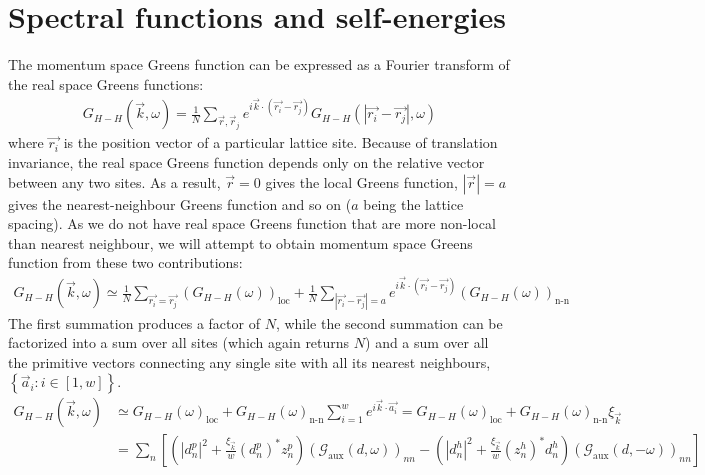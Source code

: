 \documentclass{report}
\numberwithin{equation}{section}
\begin{document}
\section{Spectral functions and self-energies}

The momentum space Greens function can be expressed as a Fourier transform of the real space Greens functions:
\begin{equation}\begin{aligned}
	G_{H-H} (\vec k, \omega) = \frac{1}{N}\sum_{\vec r, \vec r_j}e^{i \vec{k}\cdot\left(\vec{r_i} - \vec {r_j}\right)}G_{H-H} (|\vec{r_i} - \vec {r_j}|, \omega)
\end{aligned}\end{equation}
where $\vec{r_i}$ is the position vector of a particular lattice site. Because of translation invariance, the real space Greens function depends only on the relative vector between any two sites. As a result, $\vec r=0$ gives the local Greens function, $|\vec r|=a$ gives the nearest-neighbour Greens function and so on ($a$ being the lattice spacing). As we do not have real space Greens function that are more non-local than nearest neighbour, we will attempt to obtain momentum space Greens function from these two contributions:
\begin{equation}\begin{aligned}
	G_{H-H} (\vec k, \omega) \simeq \frac{1}{N}\sum_{\vec{r_i} = \vec {r_j}}\left(G_{H-H} (\omega)\right) _\text{loc} + \frac{1}{N}\sum_{|\vec{r_i} - \vec {r_j}|=a} e^{i \vec{k}\cdot\left(\vec{r_i} - \vec {r_j}\right)}\left(G_{H-H} (\omega)\right)_\text{n-n}
\end{aligned}\end{equation}
The first summation produces a factor of $N$, while the second summation can be factorized into a sum over all sites (which again returns $N$) and a sum over all the primitive vectors connecting any single site with all its nearest neighbours, $\left\{ \vec a_i: i \in \left[1, w\right]\right\}$.
\begin{equation}\begin{aligned}
	\label{k_Gf_siam}
	G_{H-H} (\vec k, \omega) &\simeq G_{H-H} (\omega)_\text{loc} + G_{H-H} (\omega)_\text{n-n}\sum_{i=1}^w e^{i \vec{k}\cdot\vec {a_i}} = G_{H-H} (\omega)_\text{loc} + G_{H-H} (\omega)_\text{n-n} \xi_{\vec k}\\
			     &= \sum_n\left[\left(|d^p_n|^2 + \frac{\xi_{\vec k}}{w}\left(d^p_n\right)^* z^p_n\right) \left(\mathcal{G}_\text{aux}(d, \omega)\right)_{nn} - \left(|d^h_n|^2 + \frac{\xi_{\vec k}}{w}\left(z^h_n\right)^* d^h_n\right) \left(\mathcal{G}_\text{aux}(d, -\omega)\right)_{nn}\right]
\end{aligned}\end{equation}
\end{document}

